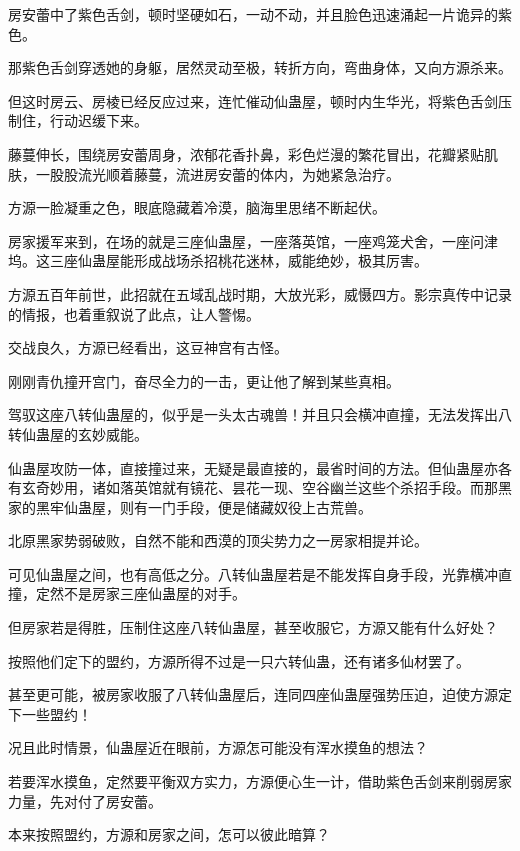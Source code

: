 
\begin{this_body}

房安蕾中了紫色舌剑，顿时坚硬如石，一动不动，并且脸色迅速涌起一片诡异的紫色。

那紫色舌剑穿透她的身躯，居然灵动至极，转折方向，弯曲身体，又向方源杀来。

但这时房云、房棱已经反应过来，连忙催动仙蛊屋，顿时内生华光，将紫色舌剑压制住，行动迟缓下来。

藤蔓伸长，围绕房安蕾周身，浓郁花香扑鼻，彩色烂漫的繁花冒出，花瓣紧贴肌肤，一股股流光顺着藤蔓，流进房安蕾的体内，为她紧急治疗。

方源一脸凝重之色，眼底隐藏着冷漠，脑海里思绪不断起伏。

房家援军来到，在场的就是三座仙蛊屋，一座落英馆，一座鸡笼犬舍，一座问津坞。这三座仙蛊屋能形成战场杀招桃花迷林，威能绝妙，极其厉害。

方源五百年前世，此招就在五域乱战时期，大放光彩，威慑四方。影宗真传中记录的情报，也着重叙说了此点，让人警惕。

交战良久，方源已经看出，这豆神宫有古怪。

刚刚青仇撞开宫门，奋尽全力的一击，更让他了解到某些真相。

驾驭这座八转仙蛊屋的，似乎是一头太古魂兽！并且只会横冲直撞，无法发挥出八转仙蛊屋的玄妙威能。

仙蛊屋攻防一体，直接撞过来，无疑是最直接的，最省时间的方法。但仙蛊屋亦各有玄奇妙用，诸如落英馆就有镜花、昙花一现、空谷幽兰这些个杀招手段。而那黑家的黑牢仙蛊屋，则有一门手段，便是储藏奴役上古荒兽。

北原黑家势弱破败，自然不能和西漠的顶尖势力之一房家相提并论。

可见仙蛊屋之间，也有高低之分。八转仙蛊屋若是不能发挥自身手段，光靠横冲直撞，定然不是房家三座仙蛊屋的对手。

但房家若是得胜，压制住这座八转仙蛊屋，甚至收服它，方源又能有什么好处？

按照他们定下的盟约，方源所得不过是一只六转仙蛊，还有诸多仙材罢了。

甚至更可能，被房家收服了八转仙蛊屋后，连同四座仙蛊屋强势压迫，迫使方源定下一些盟约！

况且此时情景，仙蛊屋近在眼前，方源怎可能没有浑水摸鱼的想法？

若要浑水摸鱼，定然要平衡双方实力，方源便心生一计，借助紫色舌剑来削弱房家力量，先对付了房安蕾。

本来按照盟约，方源和房家之间，怎可以彼此暗算？


\end{this_body}
